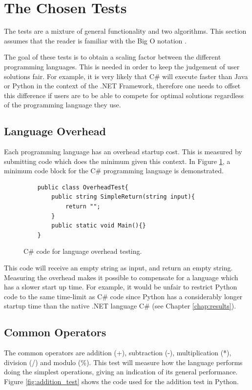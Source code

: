 \section{The Chosen Tests}
The tests are a mixture of general functionality and two algorithms. This section assumes that the reader is familiar with the Big O notation \cite{BigO}.

The goal of these tests is to obtain a scaling factor between the different programming languages. This is needed in order to keep the judgement of user solutions fair. For example, it is very likely that C\# will execute faster than Java or Python in the context of the .NET Framework, therefore one needs to offset this difference if users are to be able to compete for optimal solutions regardless of the programming language they use.

\subsection{Language Overhead}
Each programming language has an overhead startup cost. This is measured by submitting code which does the minimum given this context. In Figure \ref{fig:language_overhead}, a minimum code block for the C\# programming language is demonstrated.

\begin{figure}[h]
	\lstset{style=sharpc}
	\begin{lstlisting}
	public class OverheadTest{
		public string SimpleReturn(string input){
			return "";
		}
		public static void Main(){}
	}
	\end{lstlisting}
	\caption{C\# code for language overhead testing.}
	\label{fig:language_overhead}
\end{figure}

This code will receive an empty string as input, and return an empty string. Measuring the overhead makes it possible to compensate for a language which has a slower start up time. For example, it would be unfair to restrict Python code to the same time-limit as C\# code since Python has a considerably longer startup time than the native .NET language C\# (see Chapter \ref{chap:results}).

\subsection{Common Operators}
The common operators are addition (+), subtraction (-), multiplication (*), division (/) and modulo (\%). This test will measure how the language performs doing the simplest operations, giving an indication of its general performance. Figure \ref{fig:addition_test} shows the code used for the addition test in Python.

